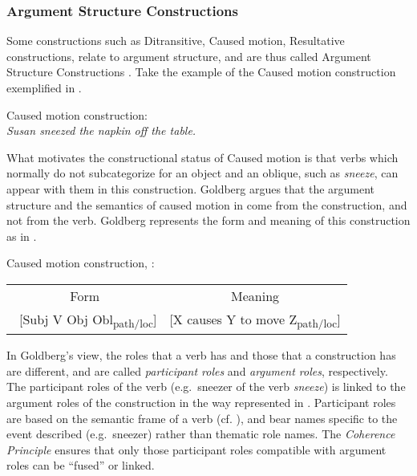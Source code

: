 \documentclass[output=paper,japanesefont,hidelinks]{langscibook}
\begin{document}
\subsubsection{Argument Structure Constructions}
\label{sec:cg:2.1.2}

Some constructions such as Ditransitive, Caused motion, Resultative constructions, relate to argument structure, and are thus called Argument Structure Constructions \citep{goldberg1995constructions,Goldberg2003,Goldberg2006,Goldberg2019,Boas2003,Bardal2008}. Take the example of the Caused motion construction exemplified in . 

\ea%
    \label{ex:cg:2}
          Caused motion construction:\\
 \textit{Susan sneezed the napkin off the table.}
    \z

What motivates the constructional status of Caused motion is that verbs which normally do not subcategorize for an object and an oblique, such as \textit{sneeze}, can appear with them in this construction. Goldberg argues that the argument structure and the semantics of caused motion in  come from the construction, and not from the verb. Goldberg represents the form and meaning of this construction as in .

\ea%
\label{ex:cg:fig1}Caused motion construction, \citet[73]{Goldberg2006}:\\
\begin{tabular}{cc}
 Form &    Meaning\\\
 [Subj V Obj Obl\textsubscript{path/loc}]  & [X causes Y to move Z\textsubscript{path/loc}]
\end{tabular}
 \z

In Goldberg's view, the roles that a verb has and those that a construction has are different, and are called \textit{participant roles} and \textit{argument roles}, respectively. The participant roles of the verb (e.g.\ sneezer of the verb \textit{sneeze}) is linked to the argument roles of the construction in the way represented in . Participant roles are based on the semantic frame of a verb (cf. \citealt{Fillmore1982}), and bear names specific to the event described (e.g.\ sneezer) rather than thematic role names. The \textit{Coherence Principle} \citep{goldberg1995constructions} ensures that only those participant roles compatible with argument roles can be ``fused'' or linked.
\end{document}

